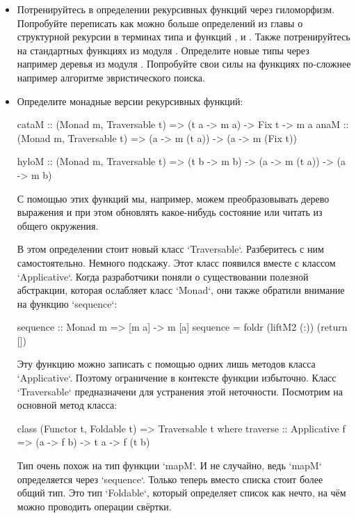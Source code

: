 \begin{itemize}
\item Потренируйтесь в определении рекурсивных функций через гиломорфизм.
    Попробуйте переписать как можно больше определений из главы
    о структурной рекурсии в терминах типа  и функций 
    ,  и . Также потренируйтесь
    на стандартных функциях из модуля . Определите
    новые типы через  например деревья из модуля
    . Попробуйте свои силы на функциях по-сложнее
    например алгоритме эвристического поиска.

\item Определите монадные версии рекурсивных функций:

\begin{code}
cataM :: (Monad m, Traversable t) => (t a -> m a) -> Fix t -> m a
anaM  :: (Monad m, Traversable t) => (a -> m (t a)) -> (a -> m (Fix t))

hyloM :: (Monad m, Traversable t) => (t b -> m b) -> (a -> m (t a)) -> (a -> m b)
\end{code}

    С помощью этих функций мы, например, можем
    преобразовывать дерево выражения и при этом обновлять
    какое-нибудь состояние или читать из общего окружения. 

    В этом определении стоит новый класс `Traversable`. 
    Разберитесь с ним самостоятельно. Немного подскажу.
    Этот класс появился вместе с классом `Applicative`.
    Когда разработчики поняли о существовании полезной
    абстракции, которая ослабляет класс `Monad`, они также
    обратили внимание на функцию `sequence`:

\begin{code}
sequence :: Monad m => [m a] -> m [a]
sequence = foldr (liftM2 (:)) (return [])  
\end{code}

    Эту функцию можно записать с помощью одних лишь
    методов класса `Applicative`. Поэтому ограничение
    в контексте функции избыточно. Класс `Traversable` 
    предназначени для устранения этой неточности.
    Посмотрим на основной метод класса:

\begin{code}
class (Functor t, Foldable t) => Traversable t where
    traverse :: Applicative f => (a -> f b) -> t a -> f (t b)
\end{code}

    Тип очень похож на тип функции `mapM`. И не случайно,
    ведь `mapM` определяется через `sequence`. Только теперь
    вместо списка стоит более общий тип. Это тип `Foldable`,
    который определяет список как нечто, на чём можно проводить
    операции свёртки. 

\end{itemize}

